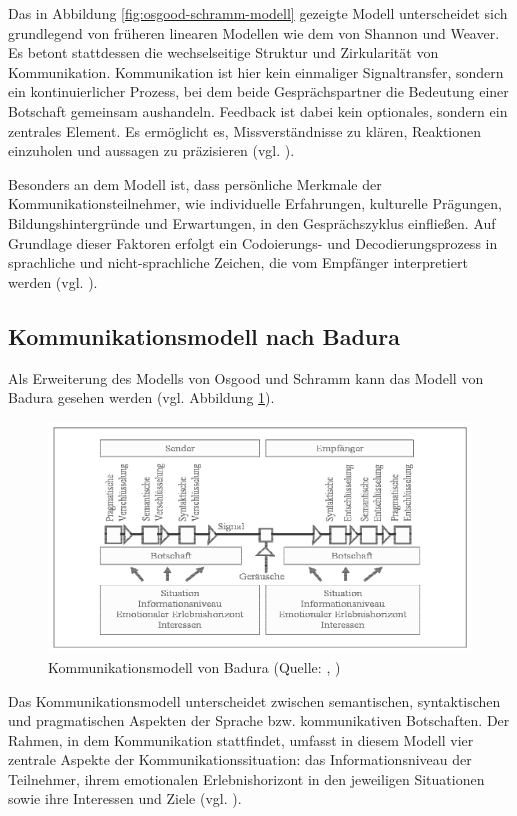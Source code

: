 Das in Abbildung \ref{fig:osgood-schramm-modell} gezeigte Modell unterscheidet sich grundlegend von früheren linearen Modellen wie dem von Shannon und Weaver. Es betont stattdessen die wechselseitige Struktur und Zirkularität von Kommunikation. Kommunikation ist hier kein einmaliger Signaltransfer, sondern ein kontinuierlicher Prozess, bei dem beide Gesprächspartner die Bedeutung einer Botschaft gemeinsam aushandeln. Feedback ist dabei kein optionales, sondern ein zentrales Element. Es ermöglicht es, Missverständnisse zu klären, Reaktionen einzuholen und aussagen zu präzisieren (vgl. \citealp{noauthor_osgood_2024}). 

Besonders an dem Modell ist, dass persönliche Merkmale der Kommunikationsteilnehmer, wie individuelle Erfahrungen, kulturelle Prägungen, Bildungshintergründe und Erwartungen, in den Gesprächszyklus einfließen. Auf Grundlage dieser Faktoren erfolgt ein Codoierungs- und Decodierungsprozess in sprachliche und nicht-sprachliche Zeichen, die vom Empfänger interpretiert werden (vgl. \citealp{noauthor_osgood_2024}). 

\subsection{Kommunikationsmodell nach Badura}
Als Erweiterung des Modells von Osgood und Schramm kann das Modell von Badura gesehen werden (vgl. Abbildung \ref{fig:badura-modell}).

\begin{figure}[ht]
\centering
\includegraphics[width=1\linewidth]{content/pictures/badura.PNG}
\caption{Kommunikationsmodell von Badura (Quelle: \cite{badura_kommunikation_1992}, \cite[S. 93]{scheufele_kommunikation_2007})}
\label{fig:badura-modell}
\end{figure}

Das Kommunikationsmodell unterscheidet zwischen semantischen, syntaktischen und pragmatischen Aspekten der Sprache bzw. kommunikativen Botschaften. Der Rahmen, in dem Kommunikation stattfindet, umfasst in diesem Modell vier zentrale Aspekte der Kommunikationssituation: das Informationsniveau der Teilnehmer, ihrem emotionalen Erlebnishorizont in den jeweiligen Situationen sowie ihre Interessen und Ziele (vgl. \citealp[S. 93]{scheufele_kommunikation_2007}).

